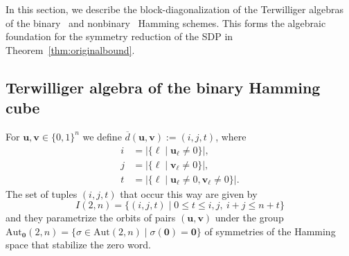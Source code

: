 \documentclass[10pt,a4paper]{article}
\theoremstyle{definition}
\newcommand{\uu}{\mathbf{u}}
\newcommand{\vv}{\mathbf{v}}
\newcommand{\zero}{\mathbf{0}}
\newcommand{\Aut}{\mathrm{Aut}}
\newcommand{\AutZ}{\mathrm{Aut}_{\zero}}
\begin{document}
In this section, we describe the block-diagonalization of the Terwilliger algebras of the binary~\cite{Sch05} and nonbinary~\cite{GST06} Hamming schemes. This forms the algebraic foundation for the symmetry reduction of the SDP in Theorem~\ref{thm:originalbound}.


\subsection{Terwilliger algebra of the binary Hamming cube \label{sec:terwilligerbinary}}
For $\uu,\vv\in \{0,1\}^n$ we define $\overline{d}(\uu,\vv):=(i,j,t)$, where 
\begin{align*}
i&=|\{\ell\mid \uu_\ell\neq 0\}|,\\
j&=|\{\ell\mid \vv_\ell\neq 0\}|,\\
t&=|\{\ell\mid \uu_\ell\neq 0, \vv_\ell\neq 0\}|.
\end{align*}
The set of tuples $(i,j,t)$ that occur this way are given by \[
I(2,n)=\{(i,j,t)\mid 0\leq t\leq i,j,\ i+j\leq n+t\}
\]
and they parametrize the orbits of pairs $(\uu,\vv)$ under the group $\AutZ(2,n)=\{\sigma\in \Aut(2,n)\mid \sigma(\zero)=\zero\}$ of symmetries of the Hamming space that stabilize the zero word.
\end{document}
